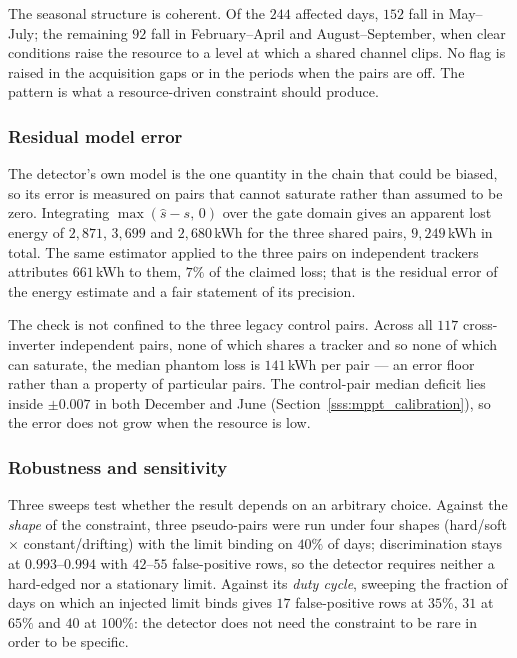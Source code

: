 The seasonal structure is coherent. Of the $244$ affected days, $152$ fall in May--July; the remaining $92$ fall in February--April and August--September, when clear conditions raise the resource to a level at which a shared channel clips. No flag is raised in the acquisition gaps or in the periods when the pairs are off. The pattern is what a resource-driven constraint should produce.

\subsubsection{Residual model error}
\label{sss:mppt_residual}

The detector's own model is the one quantity in the chain that could be biased, so its error is measured on pairs that cannot saturate rather than assumed to be zero. Integrating $\max(\widehat{s} - s,\,0)$ over the gate domain gives an apparent lost energy of $2{,}871$, $3{,}699$ and $2{,}680$\,kWh for the three shared pairs, $9{,}249$\,kWh in total. The same estimator applied to the three pairs on independent trackers attributes $661$\,kWh to them, $7\%$ of the claimed loss; that is the residual error of the energy estimate and a fair statement of its precision.

The check is not confined to the three legacy control pairs. Across all $117$ cross-inverter independent pairs, none of which shares a tracker and so none of which can saturate, the median phantom loss is $141$\,kWh per pair --- an error floor rather than a property of particular pairs. The control-pair median deficit lies inside $\pm 0.007$ in both December and June (Section~\ref{sss:mppt_calibration}), so the error does not grow when the resource is low.

\subsubsection{Robustness and sensitivity}
\label{sss:mppt_robust}

Three sweeps test whether the result depends on an arbitrary choice. Against the \emph{shape} of the constraint, three pseudo-pairs were run under four shapes (hard/soft $\times$ constant/drifting) with the limit binding on $40\%$ of days; discrimination stays at $0.993$--$0.994$ with $42$--$55$ false-positive rows, so the detector requires neither a hard-edged nor a stationary limit. Against its \emph{duty cycle}, sweeping the fraction of days on which an injected limit binds gives $17$ false-positive rows at $35\%$, $31$ at $65\%$ and $40$ at $100\%$: the detector does not need the constraint to be rare in order to be specific.

